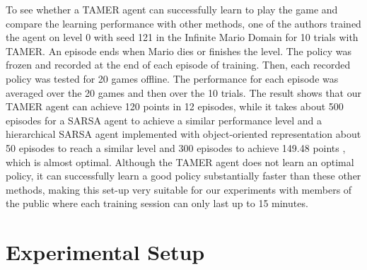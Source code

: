 \documentclass[10pt,journal,compsoc]{IEEEtran}
\begin{document}
To see whether a TAMER agent can successfully learn to play the game and compare the learning performance with other methods, one of the authors trained the agent on level 0 with seed 121 %
in the Infinite Mario Domain for 10 trials with TAMER. 
An episode ends when Mario dies or finishes the level. The policy was frozen and recorded at the end of each episode of training. Then, each recorded policy was tested for 20 games offline. The performance for each episode %
was averaged over the 20 games and then over the 10 trials. The result shows that our TAMER agent can achieve 120 points in 12 episodes, while it takes about 500 episodes for a SARSA agent to achieve a similar performance level \cite{taylor2011teaching} and a hierarchical SARSA agent implemented with object-oriented representation about 50 episodes to reach a similar level and 300 episodes to achieve 149.48 points \cite{mohan2011object}, which is almost optimal. Although the TAMER agent does not learn an optimal policy, it can successfully learn a good policy substantially faster than these other methods, making this set-up very suitable for our experiments with members of the public where each training session can only last up to 15 minutes.


\section{Experimental Setup}
\label{sec:es}
\end{document}
